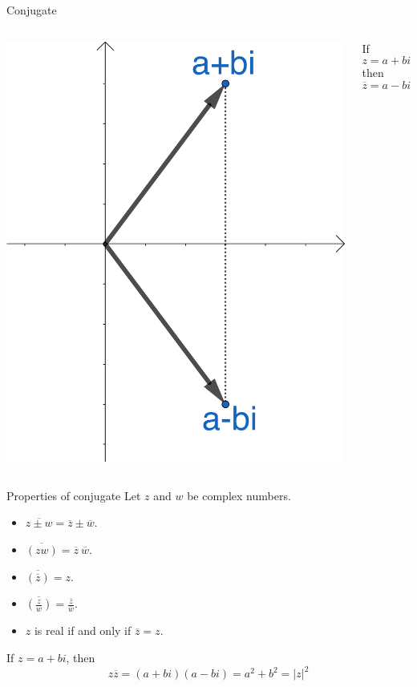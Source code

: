 \documentclass{beamer}
\begin{document}
\begin{frame}{Conjugate}
\begin{columns}
	\includegraphics[scale=0.6]{conjugate.png}
	\begin{definition}[Conjugate]
	If
	\begin{equation*}
	z=a+bi
	\end{equation*}
	then
	\begin{equation*}
	\overline{z} = a-bi
	\end{equation*}
	\end{definition}
\end{columns}
\end{frame}

\begin{frame}{Properties of conjugate}
Let $z$ and $w$ be complex numbers.
\begin{itemize}
\item
$\overline{z\pm w} = \overline{z} \pm \overline{w}$.
\item
$\overline{(zw)} = \overline{z}~ \overline{w}$.
\item
$\overline{(\overline{z})}=z$.
\item
$\overline{\left(\frac{z}{w}\right)} =
\frac{\overline{z}}{\overline{w}}$.
\item
$z$ is real if and only if $\overline{z}=z$.
\end{itemize}
If $z=a+bi$, then
\[ z\overline{z}=
(a+bi)(a-bi)=
a^2 + b^2=|z|^2\]
\end{frame}
\end{document}
